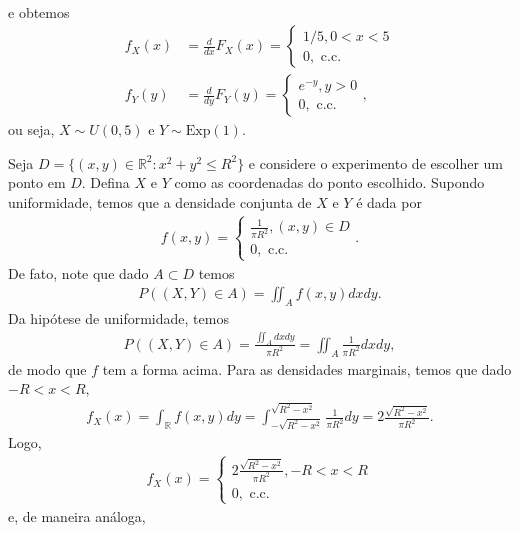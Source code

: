 \documentclass[../Notas.tex]{subfiles}
\begin{document}
\begin{example}
\begin{align*}
\end{align*}
e obtemos
\begin{align*}
    f_X(x) &= \frac{d}{dx}F_X(x) = \begin{cases}
    1/5, 0 < x < 5 \\
    0, \text{ c.c.}
    \end{cases} \\
    f_Y(y) &= \frac{d}{dy}F_Y(y) = \begin{cases}
    e^{-y}, y > 0 \\
    0, \text{ c.c.}
    \end{cases},
\end{align*}
ou seja, $X\sim U(0,5)$ e $Y\sim\text{Exp}(1)$.
\end{example}

\begin{example}
Seja $D = \{ (x,y)\in\mathbb{R}^2 : x^2+y^2\leq R^2 \}$ e considere o experimento de escolher um ponto em $D$. Defina $X$ e $Y$ como as coordenadas do ponto escolhido. Supondo uniformidade, temos que a densidade conjunta de $X$ e $Y$ é dada por
\begin{align*}
    f(x,y) = \begin{cases}
    \frac{1}{\pi R^2}, (x,y)\in D \\
    0, \text{ c.c.}
    \end{cases}.
\end{align*}
De fato, note que dado $A\subset D$ temos
\begin{align*}
    P((X,Y)\in A) = \iint_A f(x,y) dxdy.
\end{align*}
Da hipótese de uniformidade, temos
\begin{align*}
    P((X,Y)\in A) = \frac{ \iint_A dxdy }{ \pi R^2 } = \iint_A \frac{1}{\pi R^2} dxdy,
\end{align*}
de modo que $f$ tem a forma acima. Para as densidades marginais, temos que dado $-R < x < R$,
\begin{align*}
    f_X(x) = \int_{\mathbb{R}} f(x,y)dy = \int_{-\sqrt{R^2-x^2}}^{\sqrt{R^2-x^2}} \frac{1}{\pi R^2} dy = 2\frac{\sqrt{R^2 - x^2}}{\pi R^2}.
\end{align*}
Logo,
\begin{align*}
    f_X(x) = \begin{cases}
    2\frac{\sqrt{R^2 - x^2}}{\pi R^2}, -R < x < R \\
    0, \text{ c.c.}
    \end{cases}
\end{align*}
e, de maneira análoga,
\begin{align*}

\end{align*}
\end{example}
\end{document}
